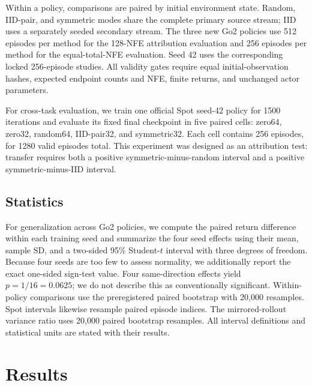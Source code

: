 \documentclass{article}
\begin{document}
Within a policy, comparisons are paired by initial environment state. Random,
IID-pair, and symmetric modes share the complete primary source stream; IID
uses a separately seeded secondary stream. The three new Go2 policies use 512
episodes per method for the 128-NFE attribution evaluation and 256 episodes per
method for the equal-total-NFE evaluation. Seed 42 uses the corresponding
locked 256-episode studies. All validity gates require equal initial-observation
hashes, expected endpoint counts and NFE, finite returns, and unchanged actor
parameters.

For cross-task evaluation, we train one official Spot seed-42 policy for 1500
iterations and evaluate its fixed final checkpoint in five paired cells:
zero64, zero32, random64, IID-pair32, and symmetric32. Each cell contains 256
episodes, for 1280 valid episodes total. This experiment was designed as an
attribution test: transfer requires both a positive symmetric-minus-random
interval and a positive symmetric-minus-IID interval.

\subsection{Statistics}

For generalization across Go2 policies, we compute the paired return difference
within each training seed and summarize the four seed effects using their mean,
sample SD, and a two-sided 95\% Student-$t$ interval with three degrees of
freedom. Because four seeds are too few to assess normality, we additionally
report the exact one-sided sign-test value. Four same-direction effects yield
$p=1/16=0.0625$; we do not describe this as conventionally significant.
Within-policy comparisons use the preregistered paired bootstrap with 20,000
resamples. Spot intervals likewise resample paired episode indices. The
mirrored-rollout variance ratio uses 20,000 paired bootstrap resamples. All
interval definitions and statistical units are stated with their results.

\section{Results}
\end{document}
